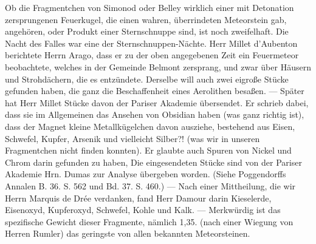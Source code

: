 \documentclass[a4paper, 11pt, oneside, polutonikogreek, german]{article}
\begin{document}
Ob die Fragmentchen von Simonod oder Belley wirklich einer mit Detonation zersprungenen Feuerkugel, die einen wahren, überrindeten Meteorstein gab, angehören, oder Produkt einer Sternschnuppe sind, ist noch zweifelhaft. Die Nacht des Falles war eine der Sternschnuppen-Nächte. Herr Millet d’Aubenton berichtete Herrn Arago, dass er zu der oben angegebenen Zeit ein Feuermeteor beobachtete, welches in der Gemeinde Belmont zersprang, und zwar über Häusern und Strohdächern, die es entzündete. Derselbe will auch zwei eigroße Stücke gefunden haben, die ganz die Beschaffenheit eines Aerolithen besaßen. — Später hat Herr Millet Stücke davon der Pariser Akademie übersendet. Er schrieb dabei, dass sie im Allgemeinen das Ansehen von Obsidian haben (was ganz richtig ist), dass der Magnet kleine Metallkügelchen davon ausziehe, bestehend aus Eisen, Schwefel, Kupfer, Arsenik und vielleicht Silber?! (was wir in unseren Fragmentchen nicht finden konnten). Er glaubte auch Spuren von Nickel und Chrom darin gefunden zu haben, Die eingesendeten Stücke sind von der Pariser Akademie Hrn. Dumas zur Analyse übergeben worden. (Siehe Poggendorffs Annalen B. 36. S. 562 und Bd. 37. S. 460.) — Nach einer Mittheilung, die wir Herrn Marquis de Drée verdanken, fand Herr Damour darin Kieselerde, Eisenoxyd, Kupferoxyd, Schwefel, Kohle und Kalk. — Merkwürdig ist das spezifische Gewicht dieser Fragmente‚ nämlich 1,35. (nach einer Wiegung von Herren Rumler) das geringste von allen bekannten Meteorsteinen.
\clearpage
\end{document}
